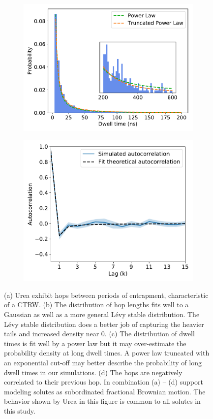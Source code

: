 \documentclass{article}
\begin{document}
\begin{figure}
  \begin{subfigure}{0.45\textwidth}
  \includegraphics[width=\textwidth]{URE_powerlaw.pdf}
  \caption{}\label{fig:powerlaw}
  \end{subfigure}
  \begin{subfigure}{0.45\textwidth}
  \includegraphics[width=\textwidth]{URE_hop_acf.pdf}
  \caption{}\label{fig:hop_acf}
  \end{subfigure}
  \caption{(a) Urea exhibit hops between periods of entrapment, characteristic of a CTRW. 
  (b) The distribution of hop lengths fits well to a Gaussian as well as a more general L\'evy 
  stable distribution. The L\'evy stable distribution does a better job of capturing the 
  heavier tails and increased density near 0. (c) The distribution of dwell times is fit
  well by a power law but it may over-estimate the probability density at long dwell times.
  A power law truncated with an exponential cut-off may better describe the probability of
  long dwell times in our simulations. (d) The hops are negatively correlated to their previous
  hop. In combination (a) -- (d) support modeling solutes as subordinated fractional Brownian
  motion. The behavior shown by Urea in this figure is common to all solutes in this study.}\label{fig:anticorrelated_hops}
  \end{figure}
  
\end{document}

